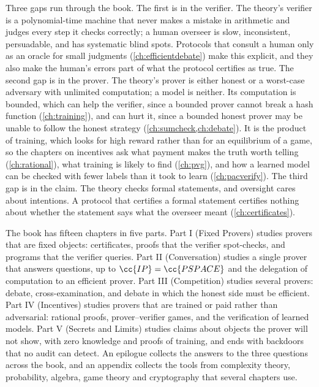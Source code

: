 \begin{refsection}
Three gaps run through the book. The first is in the verifier. The theory's verifier is a polynomial-time machine that never makes a mistake in arithmetic and judges every step it checks correctly; a human overseer is slow, inconsistent, persuadable, and has systematic blind spots. Protocols that consult a human only as an oracle for small judgments (\cref{ch:efficientdebate}) make this explicit, and they also make the human's errors part of what the protocol certifies as true. The second gap is in the prover. The theory's prover is either honest or a worst-case adversary with unlimited computation; a model is neither. Its computation is bounded, which can help the verifier, since a bounded prover cannot break a hash function (\cref{ch:training}), and can hurt it, since a bounded honest prover may be unable to follow the honest strategy (\cref{ch:sumcheck,ch:debate}). It is the product of training, which looks for high reward rather than for an equilibrium of a game, so the chapters on incentives ask what payment makes the truth worth telling (\cref{ch:rational}), what training is likely to find (\cref{ch:pvg}), and how a learned model can be checked with fewer labels than it took to learn (\cref{ch:pacverify}). The third gap is in the claim. The theory checks formal statements, and oversight cares about intentions. A protocol that certifies a formal statement certifies nothing about whether the statement says what the overseer meant (\cref{ch:certificates}).


The book has fifteen chapters in five parts. Part I (Fixed Provers) studies provers that are fixed objects: certificates, proofs that the verifier spot-checks, and programs that the verifier queries. Part II (Conversation) studies a single prover that answers questions, up to $\cc{IP}=\cc{PSPACE}$ and the delegation of computation to an efficient prover. Part III (Competition) studies several provers: debate, cross-examination, and debate in which the honest side must be efficient. Part IV (Incentives) studies provers that are trained or paid rather than adversarial: rational proofs, prover–verifier games, and the verification of learned models. Part V (Secrets and Limits) studies claims about objects the prover will not show, with zero knowledge and proofs of training, and ends with backdoors that no audit can detect. An epilogue collects the answers to the three questions across the book, and an appendix collects the tools from complexity theory, probability, algebra, game theory and cryptography that several chapters use.


\end{refsection}
